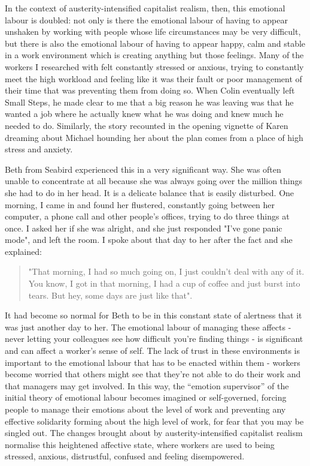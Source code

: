 In the context of austerity-intensified capitalist realism, then, this emotional labour is doubled: not only is there the emotional labour of having to appear unshaken by working with people whose life circumstances may be very difficult, but there is also the emotional labour of having to appear happy, calm and stable in a work environment which is creating anything but those feelings. Many of the workers I researched with felt constantly stressed or anxious, trying to constantly meet the high workload and feeling like it was their fault or poor management of their time that was preventing them from doing so. When Colin eventually left Small Steps, he made clear to me that a big reason he was leaving was that he wanted a job where he actually knew what he was doing and knew much he needed to do. Similarly, the story recounted in the opening vignette of Karen dreaming about Michael hounding her about the plan comes from a place of high stress and anxiety.  

Beth from Seabird experienced this in a very significant way. She was often unable to concentrate at all because she was always going over the million things she had to do in her head. It is a delicate balance that is easily disturbed. One morning, I came in and found her flustered, constantly going between her computer, a phone call and other people's offices, trying to do three things at once. I asked her if she was alright, and she just responded "I've gone panic mode", and left the room. I spoke about that day to her after the fact and she explained: 
\begin{quote} 
"That morning, I had so much going on, I just couldn't deal with any of it. You know, I got in that morning, I had a cup of coffee and just burst into tears. But hey, some days are just like that".
\end{quote}
It had become so normal for Beth to be in this constant state of alertness that it was just another day to her.  The emotional labour of managing these affects - never letting your colleagues see how difficult you’re finding things - is significant and can affect a worker’s sense of self. The lack of trust in these environments is important to the emotional labour that has to be enacted within them - workers become worried that others might see that they’re not able to do their work and that managers may get involved. In this way, the “emotion supervisor” of the initial theory of emotional labour becomes imagined or self-governed, forcing people to manage their emotions about the level of work and preventing any effective solidarity forming about the high level of work, for fear that you may be singled out. The changes brought about by austerity-intensified capitalist realism normalise this heightened affective state, where workers are used to being stressed, anxious, distrustful, confused and feeling disempowered.

